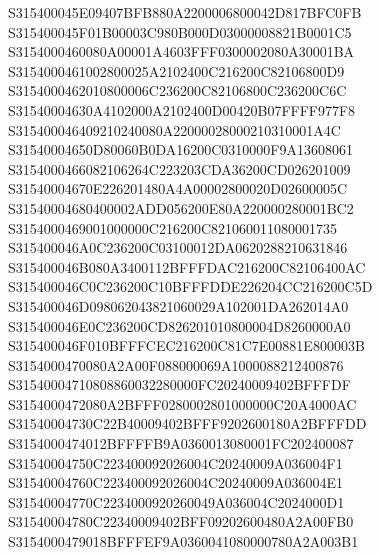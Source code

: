 \documentclass[12pt,a4paper]{article}
\begin{document}
\begin{framed}
{S315400045E09407BFB880A2200006800042D817BFC0FB\newline
S315400045F01B00003C980B000D03000008821B0001C5\newline
S3154000460080A00001A4603FFF0300002080A30001BA\newline
S3154000461002800025A2102400C216200C82106800D9\newline
S3154000462010800006C236200C82106800C236200C6C\newline
S31540004630A4102000A2102400D00420B07FFFF977F8\newline
S315400046409210240080A22000028000210310001A4C\newline
S31540004650D80060B0DA16200C0310000F9A13608061\newline
S3154000466082106264C223203CDA36200CD026201009\newline
S31540004670E226201480A4A00002800020D02600005C\newline
S31540004680400002ADD056200E80A220000280001BC2\newline
S3154000469001000000C216200C821060011080001735\newline
S315400046A0C236200C03100012DA0620288210631846\newline
S315400046B080A3400112BFFFDAC216200C82106400AC\newline
S315400046C0C236200C10BFFFDDE226204CC216200C5D\newline
S315400046D098062043821060029A102001DA262014A0\newline
S315400046E0C236200CD826201010800004D8260000A0\newline
S315400046F010BFFFCEC216200C81C7E00881E800003B\newline
S3154000470080A2A00F088000069A1000088212400876\newline
S31540004710808860032280000FC20240009402BFFFDF\newline
S3154000472080A2BFFF0280002801000000C20A4000AC\newline
S31540004730C22B40009402BFFF9202600180A2BFFFDD\newline
S3154000474012BFFFFB9A0360013080001FC202400087\newline
S31540004750C223400092026004C20240009A036004F1\newline
S31540004760C223400092026004C20240009A036004E1\newline
S31540004770C2234000920260049A036004C2024000D1\newline
S31540004780C22340009402BFF09202600480A2A00FB0\newline
S3154000479018BFFFEF9A0360041080000780A2A003B1\newline
}
\end{framed}
\end{document}
